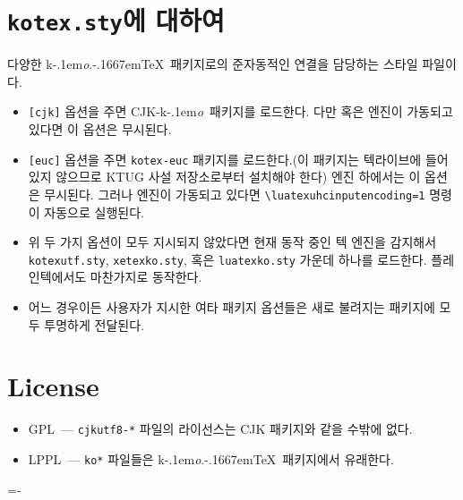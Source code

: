 \documentclass[dvipdfmx,b5paper]{article}
\def\koTeX{\textsf{k}\kern-.1em\textit{o}.\kern-.1667em\TeX}
\def\cjkko{\mbox{CJK-\textsf{k}\kern-.1em\textit{o}}}
\begin{document}
\section{\texttt{kotex.sty}에 대하여}
다양한 \koTeX\ 패키지로의 준자동적인 연결을 담당하는 스타일 파일이다.
\begin{itemize}
  \item \verb|[cjk]| 옵션을 주면 \cjkko\ 패키지를 로드한다.
    다만  혹은  엔진이 가동되고 있다면
    이 옵션은 무시된다.
  \item \verb|[euc]| 옵션을 주면 \verb|kotex-euc| 패키지를 로드한다.(이
    패키지는 텍라이브에 들어있지 않으므로 KTUG 사설 저장소로부터
    설치해야 한다)  엔진 하에서는 이 옵션은 무시된다.
    그러나  엔진이 가동되고 있다면
    \verb|\luatexuhcinputencoding=1| 명령이 자동으로 실행된다.
  \item 위 두 가지 옵션이 모두 지시되지 않았다면 현재 동작 중인 텍 엔진을
    감지해서 \verb|kotexutf.sty|, \verb|xetexko.sty|, 혹은 \verb|luatexko.sty|
    가운데 하나를 로드한다.  플레인텍에서도 마찬가지로 동작한다.
  \item 어느 경우이든 사용자가 지시한 여타 패키지 옵션들은 새로 불려지는
    패키지에 모두 투명하게 전달된다.
\end{itemize}

\section{License}
\begin{itemize}
  \item GPL~--- \verb|cjkutf8-*| 파일의 라이선스는 CJK 패키지와
    같을 수밖에 없다.
  \item LPPL~--- \verb|ko*| 파일들은 \koTeX\ 패키지에서 유래한다.
\end{itemize}
\nobreak\hfill \fboxsep=-\fboxrule {}
\end{document}
